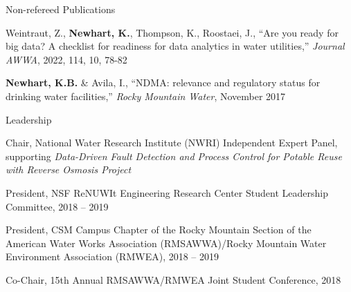 \documentclass{resume} %
\begin{document}

\begin{rSection}{Non-refereed Publications}

Weintraut, Z., \textbf{Newhart, K.}, Thompson, K., Roostaei, J., ``Are you ready for big data? A checklist for readiness for data analytics in water utilities,'' \emph{Journal AWWA}, 2022, 114, 10, 78-82

\textbf{Newhart, K.B.} \& Avila, I., ``NDMA: relevance and regulatory status for drinking water facilities,'' \emph{Rocky Mountain Water}, November 2017

\end{rSection}

\newpage


\begin{rSection}{Leadership}

Chair,  National Water Research Institute (NWRI) Independent Expert Panel, supporting \emph{Data-Driven Fault Detection and Process Control for Potable Reuse with Reverse Osmosis Project}

President, NSF ReNUWIt Engineering Research Center Student Leadership Committee, 2018 – 2019

President, CSM Campus Chapter of the Rocky Mountain Section of the American Water Works Association (RMSAWWA)/Rocky Mountain Water Environment Association (RMWEA), 2018 – 2019

Co-Chair, 15th Annual RMSAWWA/RMWEA Joint Student Conference, 2018

\end{rSection}

\end{document}
